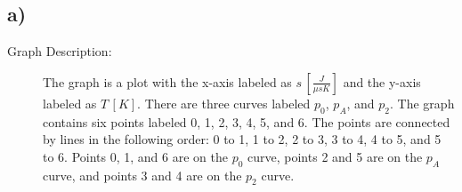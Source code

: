 

\subsection*{a)}
\begin{description}
    \item[Graph Description:] The graph is a plot with the x-axis labeled as $s \, [\frac{J}{\mu s K}]$ and the y-axis labeled as $T \, [K]$. There are three curves labeled $p_0$, $p_A$, and $p_2$. The graph contains six points labeled 0, 1, 2, 3, 4, 5, and 6. The points are connected by lines in the following order: 0 to 1, 1 to 2, 2 to 3, 3 to 4, 4 to 5, and 5 to 6. Points 0, 1, and 6 are on the $p_0$ curve, points 2 and 5 are on the $p_A$ curve, and points 3 and 4 are on the $p_2$ curve.
\end{description}